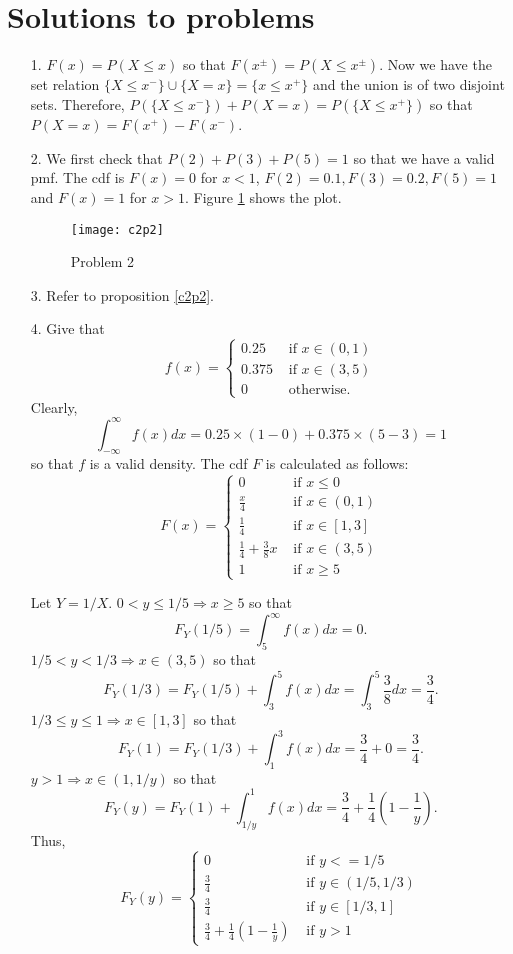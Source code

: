 \documentclass{article}
\begin{document}
\section{Solutions to problems}
\begin{enumerate}
\item[1.] $F(x) = P(X \le x)$ so that $F(x^\pm) = P(X \le x^\pm)$. Now we have
the set relation $\{X \le x^-\} \cup \{X = x\} = \{x \le x^+\}$ and the union
is of two disjoint sets. Therefore, $P(\{X \le x^-\})+P(X = x)=P(\{X \le x^+\})$
so that $P(X=x) = F(x^+) - F(x^-)$.

\item[2.] We first check that $P(2) + P(3) + P(5) = 1$ so that we have a valid
pmf. The cdf is $F(x) = 0$ for $x < 1$, $F(2) = 0.1, F(3) = 0.2, F(5) = 1$ and 
$F(x) = 1$ for $x > 1$. Figure \ref{c2f1} shows the plot.
\begin{figure}
\texttt{[image: c2p2]}
\caption{Problem 2}\label{c2f1}
\end{figure}

\item[3.] Refer to proposition \ref{c2p2}.

\item[4.] Give that
\[
f(x) = \begin{cases}
0.25 & \text{ if } x \in (0, 1) \\
0.375 & \text{ if } x \in (3, 5) \\
0 & \text{ otherwise.}
\end{cases}
\]
Clearly, 
\[
\int_{-\infty}^\infty f(x)dx = 0.25 \times (1 - 0) + 0.375 \times (5 - 3) = 1
\]
so that $f$ is a valid density. The cdf $F$ is calculated as follows: 
\[
F(x) = \begin{cases}
0 & \text{ if } x \le 0 \\
\frac{x}{4} & \text{ if } x \in (0, 1) \\
\frac{1}{4} & \text{ if } x \in [1, 3] \\
\frac{1}{4} + \frac{3}{8}x & \text{ if } x \in (3, 5) \\
1 & \text{ if } x \ge 5
\end{cases}
\]

Let $Y = 1/X$. $0 < y \le 1/5 \Rightarrow x \ge 5$ so that
\[
F_Y(1/5) = \int_5^\infty f(x) dx = 0.
\]
$1/5 < y < 1/3 \Rightarrow x \in (3, 5)$ so that
\[
F_Y(1/3) = F_Y(1/5) + \int_3^5 f(x)dx = \int_3^5\frac{3}{8}dx = \frac{3}{4}.
\]
$1/3 \le y \le 1 \Rightarrow x \in [1, 3]$ so that
\[
F_Y(1) = F_Y(1/3) + \int_1^3 f(x)dx = \frac{3}{4} + 0 = \frac{3}{4}.
\]
$y > 1 \Rightarrow x \in (1, 1/y)$ so that
\[
F_Y(y) = F_Y(1) + \int_{1/y}^1 f(x)dx 
= \frac{3}{4} + \frac{1}{4}\left(1 - \frac{1}{y}\right).
\]
Thus,
\[
F_Y(y) = \begin{cases}
0 & \text{ if } y <= 1/5 \\
\frac{3}{4} & \text{ if } y \in (1/5, 1/3) \\
\frac{3}{4} & \text{ if } y \in [1/3, 1] \\
\frac{3}{4} + \frac{1}{4}\left(1 - \frac{1}{y}\right) & \text{ if } y > 1
\end{cases}
\]


\end{enumerate}
\end{document}

